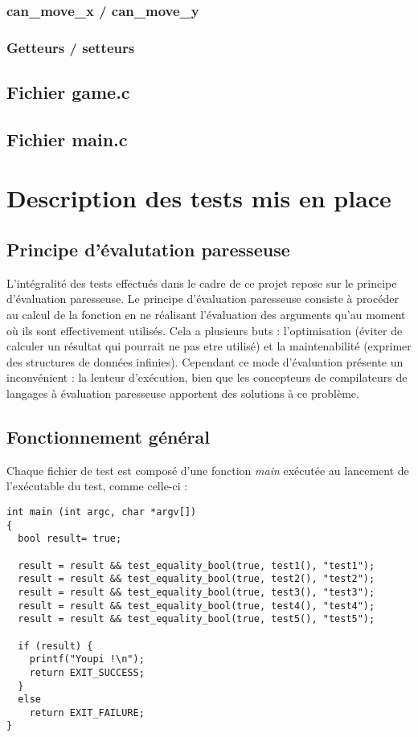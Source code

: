 \documentclass{report}
\begin{document}
\subsection{can\_move\_x / can\_move\_y}
\subsection{Getteurs / setteurs}
\section{Fichier game.c}
\section{Fichier main.c}
\chapter{Description des tests mis en place}

\section{Principe d'évalutation paresseuse}
\label{Lexa}
L'intégralité des tests effectués dans le cadre de ce projet repose sur le principe d'évaluation paresseuse. Le principe d'évaluation paresseuse consiste à procéder au calcul de la fonction en ne réalisant l'évaluation des arguments qu'au moment où ils sont effectivement utilisés. Cela a plusieurs buts : l'optimisation (éviter de calculer un résultat qui pourrait ne pas etre utilisé) et la maintenabilité (exprimer des structures de données infinies). Cependant ce mode d'évaluation présente un inconvénient : la lenteur d'exécution, bien que les concepteurs de compilateurs de langages à évaluation paresseuse apportent des solutions à ce problème.

\section{Fonctionnement général}
\label{Clarke}
Chaque fichier de test est composé d'une fonction \emph{main} exécutée au lancement de l'exécutable du test, comme celle-ci :
\begin{lstlisting}
int main (int argc, char *argv[])
{
  bool result= true;

  result = result && test_equality_bool(true, test1(), "test1");
  result = result && test_equality_bool(true, test2(), "test2");
  result = result && test_equality_bool(true, test3(), "test3");
  result = result && test_equality_bool(true, test4(), "test4");
  result = result && test_equality_bool(true, test5(), "test5");

  if (result) {
    printf("Youpi !\n");
    return EXIT_SUCCESS;
  }
  else
    return EXIT_FAILURE;
}
\end{lstlisting}
\end{document}
